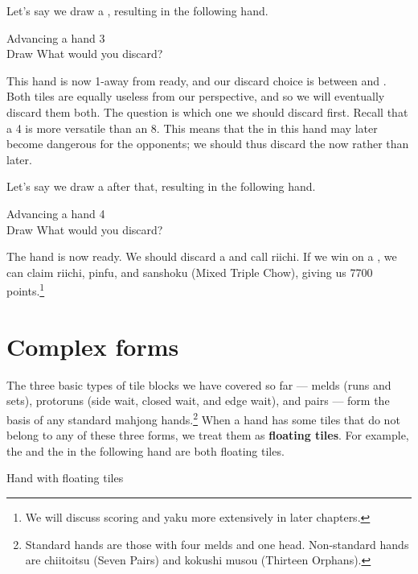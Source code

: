 \bigskip
Let's say we draw a {\large{}}, resulting in the following hand. 
\begin{itembox}[r]{Advancing a hand 3}
\bp
{}~\\
\hspace{290pt}\footnotesize{Draw}
\ep
\vspace{-17pt}What would you discard? \vspace{-5pt}
\end{itembox}
\noindent
This hand is now 1-away from ready, and our discard choice is between {\large{}} and {\large{}}. Both tiles are equally useless from our perspective, and so we will eventually discard them both. The question is which one we should discard first. Recall that a 4 is more versatile than an 8. This means that the {\large{}} in this hand may later become dangerous for the opponents; we should thus discard the {\large{}} now rather than later. 

\bigskip
Let's say we draw a {\large{}} after that, resulting in the following hand.
\begin{itembox}[r]{Advancing a hand 4}
\bp
{}~\\
\hspace{290pt}\footnotesize{Draw}
\ep
\vspace{-17pt}What would you discard? \vspace{-5pt}
\end{itembox}
\noindent
The hand is now ready. We should discard a {\large{}} and call {\jap riichi}. If we win on a {\large{}}, we can claim {\jap riichi}, {\jap pinfu}, and {\jap sanshoku} (Mixed Triple Chow), giving us 7700 points.\footnote{We will discuss scoring and {\jap yaku} more extensively in later chapters.}

\newpage
\section{Complex forms}
The three basic types of tile blocks we have covered so far --- melds (runs and sets), protoruns (side wait, closed wait, and edge wait), and pairs --- form the basis of any standard mahjong hands.\footnote{Standard hands are those with four melds and one head. Non-standard hands are {\jap chiitoitsu} (Seven Pairs) and {\jap kokushi musou} (Thirteen Orphans).}  
When a hand has some tiles that do not belong to any of these three forms, we treat them as {\bf floating tiles}. For example, the {\large{}} and the {\large{}} in the following hand are both floating tiles. 
\bigskip
\begin{itembox}[r]{Hand with floating tiles}
\bp
{}
\ep
\end{itembox}

